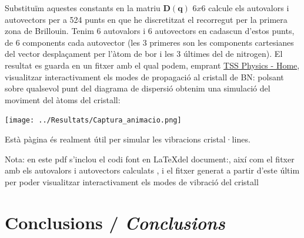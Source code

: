 \documentclass[12pt]{article} %
\let\vec\mathbf %
\begin{document}
Substituïm aquestes constants en la matriu $\vec D(\vec q)$ $6x6$ calcule els autovalors i autovectors per a 524 punts en que he discretitzat el recorregut per la primera zona de Brillouin. Tenim 6 autovalors i 6 autovectors en cadascun d'estos punts, de 6 components cada autovector (les 3 primeres son les components cartesianes del vector desplaçament per l'àtom de bor i les 3 últimes del de nitrogen). El resultat es guarda en un fitxer  amb el qual podem, emprant \href{https://henriquemiranda.github.io/phononwebsite/index.html}{TSS Physics - Home}, visualitzar interactivament els modes de propagació al cristall de BN: polsant sobre qualsevol punt del diagrama de dispersió obtenim una simulació del moviment del àtoms del cristall:

\begin{center}
 \texttt{[image: ../Resultats/Captura\_animacio.png]}
\end{center}

Està pàgina és realment útil per simular les vibracions cristal·lines.

\vspace{2cm}

Nota: en este pdf s'inclou el codi font en \LaTeX  del document:, així com el fitxer amb els autovalors i autovectors calculats , i el fitxer generat a partir d'este últim per poder visualitzar  interactivament els modes de vibració del cristall 

\section{Conclusions / \emph{Conclusions}}
\end{document}
